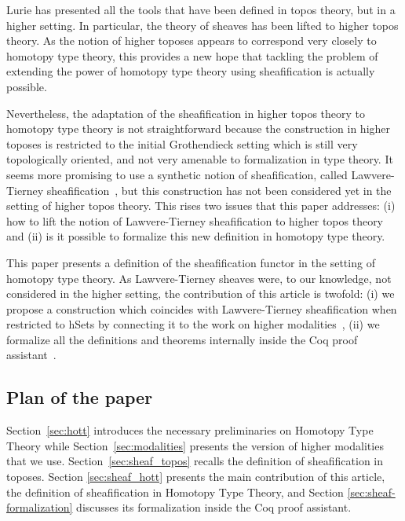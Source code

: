 \documentclass[notfinal]{jfrarticle}
\begin{document}
Lurie has presented all the tools that have been defined in
topos theory, but in a higher setting. In particular, the theory of
sheaves has been lifted to higher topos theory.
%
As the notion of higher toposes appears to correspond very closely to
homotopy type theory, this provides a new hope that tackling the
problem of extending the power of homotopy type theory using
sheafification is actually possible.

Nevertheless, the adaptation of the sheafification in higher topos
theory to homotopy type theory is not straightforward because the
construction in higher toposes is restricted to the initial Grothendieck
setting which is still very topologically oriented, and not very
amenable to formalization in type theory. It seems more promising to
use a synthetic notion of sheafification, called Lawvere-Tierney
sheafification~\cite{tierney1972sheaf,maclanemoerdijk}, but this construction has not
been considered yet in the setting of higher topos theory. This rises
two issues that this paper addresses: (i) how to lift the notion of
Lawvere-Tierney sheafification to higher topos theory and (ii) is it
possible to formalize this new definition in homotopy type theory.



This paper presents a definition of the sheafification functor in the
setting of homotopy type theory. As Lawvere-Tierney sheaves were, to
our knowledge, not considered in the higher setting, the contribution
of this article is twofold: (i) we propose a construction which
coincides with Lawvere-Tierney sheafification when restricted to hSets
by connecting it to the work on higher modalities~\cite{hottbook},
(ii) we formalize all the definitions and theorems internally inside
the Coq proof assistant~\cite{Coq:manual}.

\subsection*{Plan of the paper}

Section~\ref{sec:hott} introduces the necessary preliminaries on
Homotopy Type Theory while Section~\ref{sec:modalities} presents the
version of higher modalities that we
use. Section~\ref{sec:sheaf_topos} recalls the definition of
sheafification in toposes. Section \ref{sec:sheaf_hott} presents the
main contribution of this article, the definition of sheafification in
Homotopy Type Theory, and Section \ref{sec:sheaf-formalization}
discusses its formalization inside the Coq proof assistant. 
\end{document}
